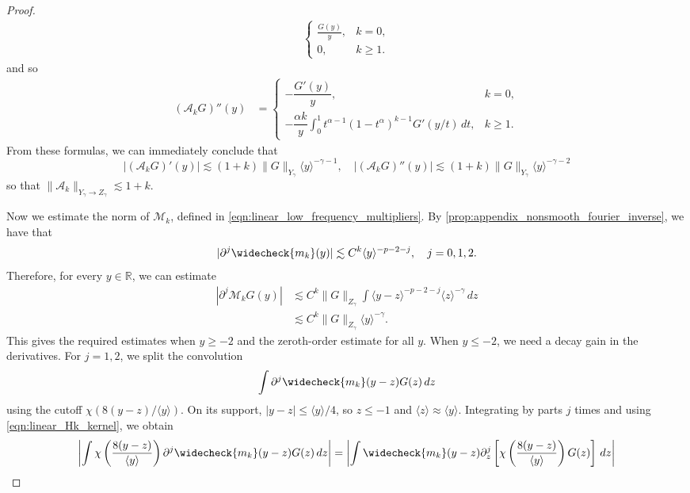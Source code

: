 \documentclass[11pt]{amsart}
\theoremstyle{definition}
\theoremstyle{remark}
\numberwithin{equation}{section}
\newcommand{\R}{\mathbb{R}}
\newcommand{\mc}[1]{\mathcal{#1}}
\newcommand{\ang}[1]{\langle #1 \rangle}
\begin{document}
\begin{proof}
\begin{align*}
\begin{cases}
            \frac{G(y)}{y}, & k = 0,\\
            0, & k \geq 1.
        \end{cases}
    \end{align*}
    and so 
    \begin{align*}
        (\mc{A}_kG)''(y) & = \begin{cases}
            -\dfrac{G'(y)}{y}, & k = 0,\\[6pt]
            -\dfrac{\alpha k}{y}\displaystyle\int_0^1 t^{\alpha-1}(1-t^\alpha)^{k-1}G'(y/t)\,dt, & k \geq 1.
        \end{cases}
    \end{align*}
    From these formulas, we can immediately conclude that
    \[|(\mc{A}_kG)'(y)| \lesssim (1 + k) \|G\|_{Y_\gamma} \ang{y}^{-\gamma - 1}, \quad |(\mc{A}_kG)''(y)| \lesssim (1 + k) \|G\|_{Y_\gamma} \ang{y}^{-\gamma - 2}\]
    so that $\|\mc{A}_k\|_{Y_\gamma \to Z_\gamma} \lesssim 1 + k$. \par
    Now we estimate the norm of $\mc{M}_k$, defined in \eqref{eqn:linear_low_frequency_multipliers}.  By \cref{prop:appendix_nonsmooth_fourier_inverse}, we have that 
    \begin{equation}\label{eqn:linear_Hk_kernel}
        |\partial^{j}\widecheck{m_k}(y)| \lesssim C^k \ang{y}^{-p - 2 - j}, \quad j = 0, 1, 2.
    \end{equation}
    Therefore, for every $y \in \R$, we can estimate
    \begin{align*}
        |\partial^j\mc{M}_kG(y)| & \lesssim C^k \|G\|_{Z_\gamma} \int \ang{y - z}^{-p - 2 - j}\ang{z}^{-\gamma}\,dz \\
        & \lesssim C^k \|G\|_{Z_\gamma} \ang{y}^{-\gamma}.
    \end{align*}
    This gives the required estimates when $y \geq -2$ and the zeroth-order estimate for all $y$. When $y \leq -2$, we need a decay gain in the derivatives. For $j = 1, 2$, we split the convolution
    \[\int \partial^j \widecheck{m_k}(y-z)G(z)\,dz\]
   using the cutoff $\chi(8(y-z)/\ang{y})$. On its support, $|y-z| \leq \ang{y}/4$, so $z \leq -1$ and $\ang{z} \approx \ang{y}$. Integrating by parts $j$ times and using \eqref{eqn:linear_Hk_kernel}, we obtain
    \begin{align*}
        \left|\int \chi\left(\frac{8(y-z)}{\ang{y}}\right)\partial^j\widecheck{m_k}(y-z)G(z)\,dz\right| & = \left|\int \widecheck{m_k}(y-z)\partial_z^j\left[\chi\left(\frac{8(y-z)}{\ang{y}}\right)G(z)\right]\,dz\right| \\

\end{align*}
\end{proof}
\end{document}
